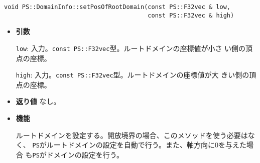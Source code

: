 \begin{screen}
\begin{verbatim}
void PS::DomainInfo::setPosOfRootDomain(const PS::F32vec & low,
                                        const PS::F32vec & high)
\end{verbatim}
\end{screen}

\begin{itemize}

\item{{\bf 引数}}

{\tt low}: 入力。{\tt const PS::F32vec}型。ルートドメインの座標値が小さ
い側の頂点の座標。

{\tt high}: 入力。{\tt const PS::F32vec}型。ルートドメインの座標値が大
きい側の頂点の座標。

\item{{\bf 返り値}}
なし。

\item{{\bf 機能}}

ルートドメインを設定する。開放境界の場合、このメソッドを使う必要はなく、
{\tt PS}がルートドメインの設定を自動で行う。また、軸方向に0を与えた場合
も{\tt PS}がドメインの設定を行う。

\end{itemize}






